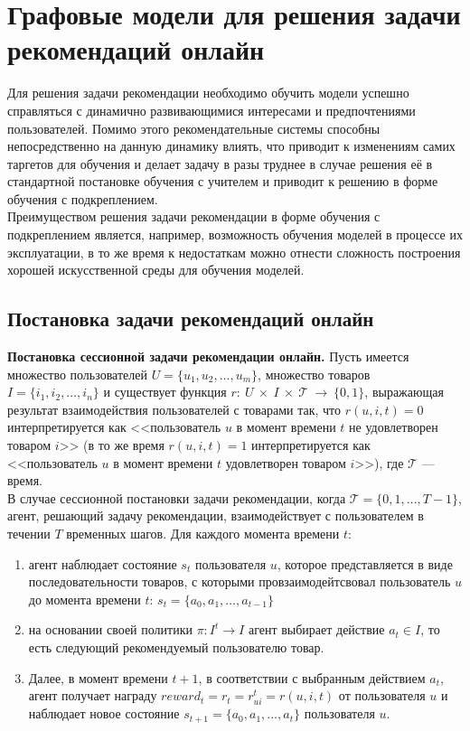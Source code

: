 \documentclass{mipt-thesis-ms}
\begin{document}
\chapter{Графовые модели для решения задачи рекомендаций онлайн}
Для решения задачи рекомендации необходимо обучить модели успешно справляться с динамично развивающимися интересами и предпочтениями пользователей. Помимо этого рекомендательные системы способны непосредственно на данную динамику влиять, что приводит к изменениям самих таргетов для обучения и делает задачу в разы труднее в случае решения её в стандартной постановке обучения с учителем и приводит к решению в форме обучения с подкреплением.\\

Преимуществом решения задачи рекомендации в форме обучения с подкреплением является, например, возможность обучения моделей в процессе их эксплуатации, в то же время к недостаткам можно отнести сложность построения хорошей искусственной среды для обучения моделей.

\section{Постановка задачи рекомендаций онлайн}
{\bf Постановка сессионной задачи рекомендации онлайн.} Пусть имеется множество пользователей $U = \{u_1, u_2, \dots, u_m\}$, множество товаров $I = \{i_1, i_2, \dots, i_n\}$ и существует функция $r:~U~\times~I~\times~\mathcal{T}~\rightarrow~\{0,  1\}$, выражающая результат взаимодействия пользователей с товарами так, что $r(u, i, t) = 0$ интерпретируется как <<пользователь $u$ в момент времени $t$ не удовлетворен товаром $i$>> (в то же время $r(u, i, t) = 1$ интерпретируется как <<пользователь $u$ в момент времени $t$ удовлетворен товаром $i$>>), где $\mathcal{T}$ --- время.\\
В случае сессионной постановки задачи рекомендации, когда $\mathcal{T} = \{0, 1, \dots, T - 1\}$, агент, решающий задачу рекомендации, взаимодействует с пользователем в течении $T$ временных шагов. Для каждого момента времени $t$: \\
\begin{enumerate}
\item агент наблюдает состояние $s_t$ пользователя $u$, которое представляется в виде последовательности товаров, с которыми провзаимодейтсвовал пользователь $u$ до момента времени $t$: $s_t = \{a_0, a_1, \dots, a_{t-1}\}$ \\
\item на основании своей политики $\pi: I^t \rightarrow I$ агент выбирает действие $a_t \in I$, то есть следующий рекомендуемый пользователю товар. 
\item Далее, в момент времени $t+1$, в соответствии с выбранным действием $a_t$, агент получает награду ${reward}_t = r_t = r^{t}_{ui} = r(u, i, t)$ от пользователя $u$ и наблюдает новое состояние $s_{t+1} = \{a_0, a_1, \dots, a_{t}\}$ пользователя $u$. 
\end{enumerate}
\end{document}
